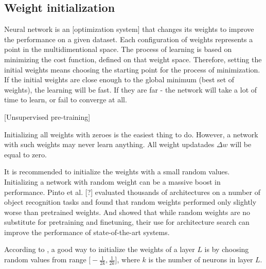 \subsection{Weight initialization}
Neural network is an [optimization system] that changes its weights to improve the performance on a given dataset. Each configuration of weights represents a point in the multidimentional space. The process of learning is based on minimizing the cost function, defined on that weight space. Therefore, setting the initial weights means choosing the starting point for the process of minimization. If the initial weights are close enough to the global minimum (best set of weights), the learning will be fast. If they are far - the network will take a lot of time to learn, or fail to converge at all.

[Unsupervised pre-training]

Initializing all weights with zeroes is the easiest thing to do. However, a network with such weights may never learn anything. All weight updatades $\Delta w$ will be equal to zero.

It is recommended to initialize the weights with a small random values. Initializing a network with random weight can be a massive boost in performance. Pinto et al. [?] evaluated thousands of architectures on a number of object recognition tasks and found that random weights performed only slightly worse than pretrained weights. And \cite{Saxe-et-al-TODO} showed that while random weights are no substitute for pretraining and finetuning, their use for architecture search can improve the performance of state-of-the-art systems. 

According to \cite{Trushevskyi-2014}, a good way to initialize the weights of a layer $L$ is by choosing random values from range $\big[-\frac{1}{2k}, \frac{1}{2k}\big]$, where $k$ is the number of neurons in layer $L$.
